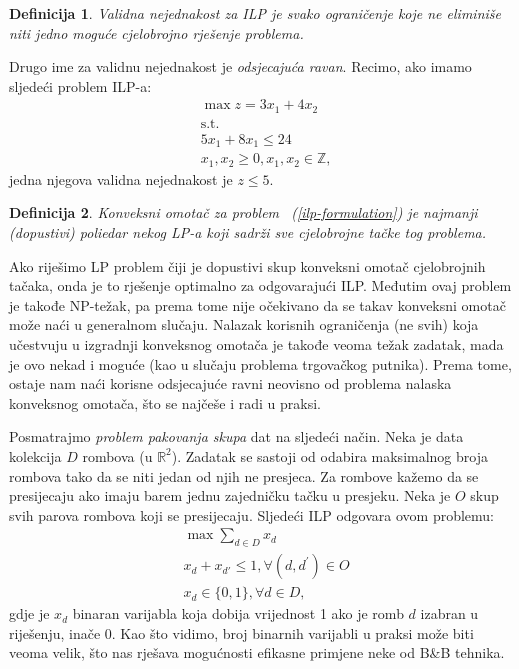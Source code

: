 \documentclass[a4paper, utf8, 11pt, colorlinks]{book}
\newtheorem{definition}{Definicija}
\begin{document}
 \begin{definition}{Validna nejednakost} za ILP je svako ograničenje koje ne eliminiše niti   jedno moguće cjelobrojno rješenje problema.
 \end{definition}
 Drugo ime za {validnu nejednakost} je \emph{odsjecajuća ravan}.
Recimo, ako imamo sljedeći problem ILP-a:
\begin{align*}
    &\max z = 3x_1 + 4 x_2 \\
    &\mbox{s.t.} \\
    &5x_1 + 8x_1 \leq 24 \\
    & x_1, x_2 \geq 0, x_1,x_2\in \mathbb{Z},
\end{align*}
jedna njegova validna nejednakost je $z \leq 5$. 

\begin{definition}
      Konveksni omotač za problem  ~(\ref{ilp-formulation}) je najmanji (dopustivi) poliedar nekog LP-a koji sadrži sve cjelobrojne tačke tog problema.
\end{definition}
Ako riješimo LP problem čiji je dopustivi skup konveksni omotač cjelobrojnih tačaka, onda je to rješenje optimalno za odgovarajući ILP. Međutim ovaj problem je takođe  NP-težak, pa prema tome nije očekivano da se takav konveksni omotač može naći u generalnom slučaju. Nalazak korisnih ograničenja (ne svih) koja učestvuju u izgradnji konveksnog omotača je takođe veoma težak zadatak, mada je ovo nekad i moguće (kao u slučaju problema trgovačkog putnika). Prema tome, ostaje nam naći korisne odsjecajuće ravni neovisno od problema nalaska konveksnog omotača, što se najčeše i radi  u praksi. 

Posmatrajmo   \emph{problem pakovanja skupa} dat na sljedeći način. Neka je data kolekcija $D$ rombova (u $\mathbb{R}^2$). 
Zadatak se sastoji od odabira maksimalnog broja rombova tako da se niti jedan od njih ne presjeca.  Za rombove kažemo da se presijecaju ako imaju barem jednu zajedničku tačku u presjeku. 
Neka je $O$ skup svih parova rombova koji se presijecaju. Sljedeći ILP odgovara ovom problemu:
\begin{align*}
    &\max \sum_{d\in D}x_d\\
    & x_d + x_{d'} \leq 1, \forall (d, d^{'}) \in O \\
    & x_d \in \{0,1\}, \forall d \in D,
\end{align*}
gdje je $x_d$ binaran varijabla koja dobija vrijednost 1 ako je romb $d$ izabran u riješenju, inače 0. 
Kao što vidimo, broj binarnih varijabli u praksi može biti veoma velik, što nas rješava mogućnosti efikasne primjene neke od B\&B tehnika.
\end{document}
